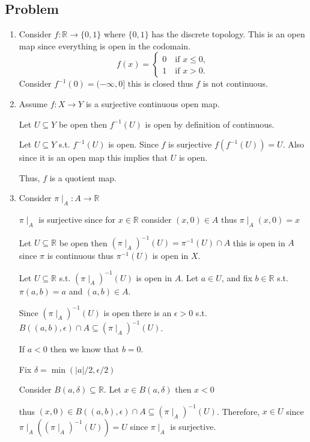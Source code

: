\documentclass[12pt, letterpaper]{article}
\newcounter{problem}
\newcommand{\q}{
    \newpage %
    \stepcounter{problem} %
    \subsection*{Problem \arabic{problem}} %
}
\newcommand{\R}{\mathbb{R}}
\renewcommand{\t}[1]{\text{#1}}
\begin{document}
\q
\begin{enumerate}
    \item Consider $f: \R \to \{0,1\}$ where $\{0,1\}$ has the discrete topology. This is an open map since everything is open in the codomain.
    \begin{equation*}
        f(x)=\begin{cases*}
            0 \quad \t{if } x \leq 0,\\
            1 \quad \t{if } x > 0.
        \end{cases*}
    \end{equation*}
    Consider $f^{-1}(0)=(-\infty,0]$ this is closed thus $f$ is not continuous.

    \item Assume $f: X \to Y$ is a surjective continuous open map.
    
    Let $U \subseteq Y$ be open then $f^{-1}(U)$ is open by definition of continuous.

    Let $U \subseteq Y$ s.t. $f^{-1}(U)$ is open. Since $f$ is surjective $f(f^{-1}(U))=U$. Also since it is an open map this implies that $U$ is open.

    Thus, $f$ is a quotient map.

    \item Consider $\pi \mid_A : A \to \R$
    
    $\pi \mid_A$ is surjective since for $x \in \R$ consider $(x,0) \in A$ thus $\pi \mid_A(x,0)=x$
    
    Let $U \subseteq \R$ be open then $(\pi \mid_A)^{-1}(U)=\pi^{-1}(U) \cap A$ this is open in $A$ since $\pi$ is continuous thus $\pi^{-1}(U)$ is open in $X$.

    Let $U \subseteq \R$ s.t. $(\pi \mid_A)^{-1}(U)$ is open in $A$. Let $a \in U$, and fix $b \in \R$ s.t. $\pi(a,b)=a$ and $(a,b) \in A$.

    Since $(\pi \mid_A)^{-1}(U)$ is open there is an $\epsilon > 0$ s.t. $B((a,b),\epsilon) \cap A \subseteq (\pi \mid_A)^{-1}(U)$.

    If $a < 0$ then we know that $b=0$. 

    Fix $\delta = \min(|a|/2, \epsilon/2)$

    Consider $B(a,\delta) \subseteq \R$. Let $x \in B(a,\delta)$ then $x < 0$ 
    
    thus $(x,0) \in B((a,b),\epsilon) \cap A \subseteq (\pi \mid_A)^{-1}(U)$. Therefore, $x \in U$ since $\pi \mid_A((\pi \mid_A)^{-1}(U))=U$ since $\pi \mid_A$ is surjective.


\end{enumerate}
\end{document}
